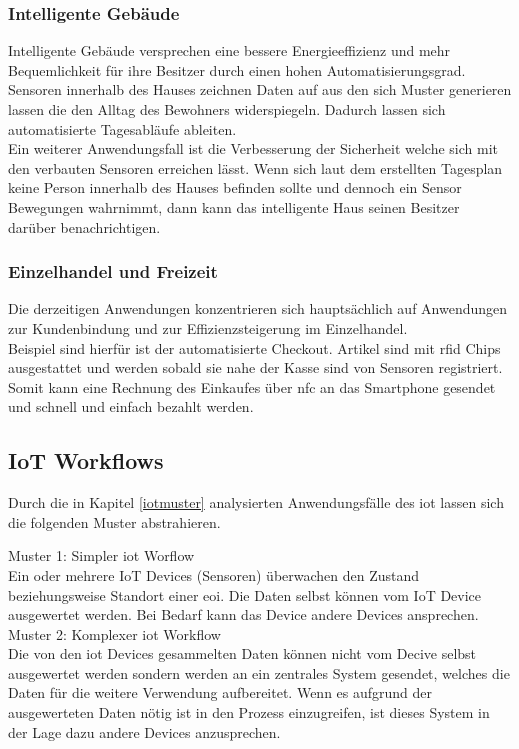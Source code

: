 \documentclass[a4paper, 12pt, twoside, headsepline=true]{scrartcl} %
\begin{document}
\subsubsection{Intelligente Gebäude}
Intelligente Gebäude versprechen eine bessere Energieeffizienz und mehr Bequemlichkeit für ihre Besitzer durch einen hohen Automatisierungsgrad\cite[S.82-85]{iotDevelopments}. Sensoren innerhalb des Hauses zeichnen Daten auf aus den sich Muster generieren lassen die den Alltag des Bewohners widerspiegeln. Dadurch lassen sich automatisierte Tagesabläufe ableiten. \\
Ein weiterer Anwendungsfall ist die Verbesserung der Sicherheit welche sich mit den verbauten Sensoren erreichen lässt. Wenn sich laut dem erstellten Tagesplan keine Person innerhalb des Hauses befinden sollte und dennoch ein Sensor Bewegungen wahrnimmt, dann kann das intelligente Haus seinen Besitzer darüber benachrichtigen.

\subsubsection{Einzelhandel und Freizeit}
Die derzeitigen Anwendungen konzentrieren sich hauptsächlich auf Anwendungen zur Kundenbindung und zur Effizienzsteigerung im Einzelhandel\cite[S.86-90]{iotDevelopments}. \\
Beispiel sind hierfür ist der automatisierte Checkout. Artikel sind mit \ac{rfid} Chips ausgestattet und werden sobald sie nahe der Kasse sind von Sensoren registriert. Somit kann eine Rechnung des Einkaufes über \ac{nfc} an das Smartphone gesendet und schnell und einfach bezahlt werden.

\subsection{IoT Workflows}\label{muster}
Durch die in Kapitel \ref{iotmuster} analysierten Anwendungsfälle des \ac{iot} lassen sich die folgenden Muster abstrahieren.

Muster 1: Simpler \ac{iot} Worflow\\
Ein oder mehrere IoT Devices (Sensoren) überwachen den Zustand beziehungsweise Standort einer \ac{eoi}. Die Daten selbst können vom IoT Device ausgewertet werden. Bei Bedarf kann das Device andere Devices ansprechen.\\

Muster 2: Komplexer \ac{iot} Workflow\\
Die von den \ac{iot} Devices gesammelten Daten können nicht vom Decive selbst ausgewertet werden sondern werden an ein zentrales System gesendet, welches die Daten für die weitere Verwendung aufbereitet. Wenn es aufgrund der ausgewerteten Daten nötig ist in den Prozess einzugreifen, ist dieses System in der Lage dazu andere Devices anzusprechen. \\
\end{document}
